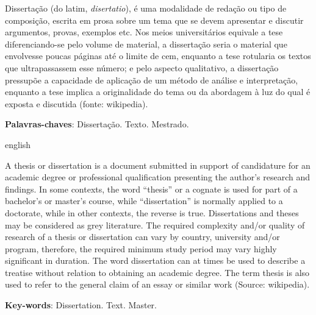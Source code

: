 \setlength{\absparsep}{18pt} %
                     
\begin{resumo}
Dissertação (do latim, \emph{disertatio}), é uma modalidade de redação ou tipo de composição, escrita em prosa sobre um tema que se devem apresentar e discutir argumentos, provas, exemplos etc. Nos meios universitários equivale a tese diferenciando-se pelo volume de material, a dissertação seria o material que envolvesse poucas páginas até o limite de cem, enquanto a tese rotularia os textos que ultrapassassem esse número; e pelo aspecto qualitativo, a dissertação pressupõe a capacidade de aplicação de um método de análise e interpretação, enquanto a tese implica a originalidade do tema ou da abordagem à luz do qual é exposta e discutida (fonte: wikipedia).

\textbf{Palavras-chaves}: Dissertação. Texto. Mestrado.

\end{resumo}


\begin{resumo}[Abstract]
 \begin{otherlanguage*}{english}

A thesis or dissertation is a document submitted in support of candidature for an academic degree or professional qualification presenting the author's research and findings. In some contexts, the word ``thesis'' or a cognate is used for part of a bachelor's or master's course, while ``dissertation'' is normally applied to a doctorate, while in other contexts, the reverse is true. Dissertations and theses may be considered as grey literature. The required complexity and/or quality of research of a thesis or dissertation can vary by country, university and/or program, therefore, the required minimum study period may vary highly significant in duration. The word dissertation can at times be used to describe a treatise without relation to obtaining an academic degree. The term thesis is also used to refer to the general claim of an essay or similar work (Source: wikipedia).

\textbf{Key-words}: Dissertation. Text. Master.

 \end{otherlanguage*}
\end{resumo}

